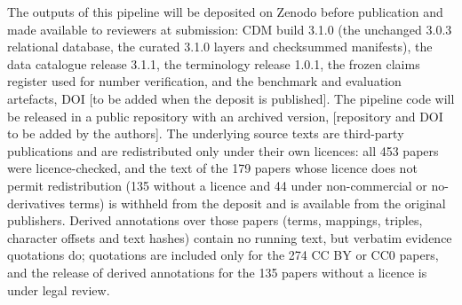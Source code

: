 \documentclass[referee,lineno,pdflatex,sn-vancouver-num]{sn-jnl}
\theoremstyle{thmstyleone}%
\theoremstyle{thmstyletwo}%
\theoremstyle{thmstylethree}%
\begin{document}
The outputs of this pipeline will be deposited on Zenodo before
publication and made available to reviewers at submission: CDM build
3.1.0 (the unchanged 3.0.3 relational database, the curated 3.1.0 layers
and checksummed manifests), the data catalogue release 3.1.1, the
terminology release 1.0.1, the frozen claims register used for number
verification, and the benchmark and evaluation artefacts, DOI [to be
added when the deposit is published]. The pipeline code will be released
in a public repository with an archived version, [repository and DOI to
be added by the authors]. The underlying source texts are third-party
publications and are redistributed only under their own licences: all
453 papers were licence-checked, and the text of the 179 papers whose
licence does not permit redistribution (135 without a licence and 44
under non-commercial or no-derivatives terms) is withheld from the
deposit and is available from the original publishers. Derived annotations
over those papers (terms, mappings, triples, character offsets and text
hashes) contain no running text, but verbatim evidence quotations do; quotations
are included only for the 274 CC BY or CC0 papers, and the release of derived
annotations for the 135 papers without a licence is under legal review.
\end{document}
